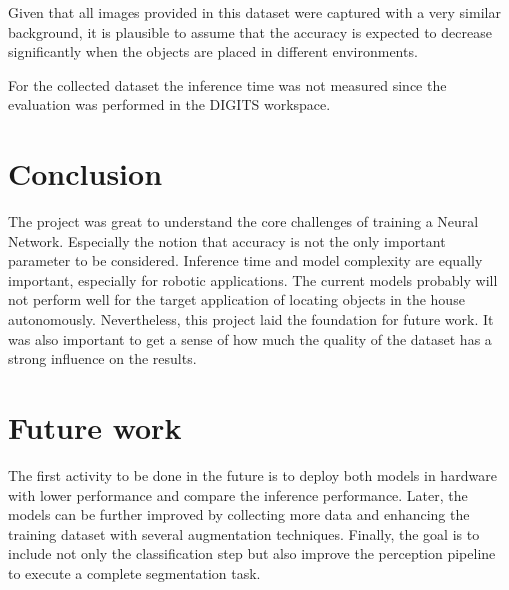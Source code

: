 \documentclass[10pt,journal,compsoc]{IEEEtran}
\begin{document}
Given that all images provided in this dataset were captured with a very similar background, it is plausible to assume that the accuracy is expected to decrease significantly when the objects are placed in different environments. 

For the collected dataset the inference time was not measured since the evaluation was performed in the DIGITS workspace.


\section{Conclusion}

The project was great to understand the core challenges of training a Neural Network. Especially the notion that accuracy is not the only important parameter to be considered. Inference time and model complexity are equally important, especially for robotic applications.
The current models probably will not perform well for the target application of locating objects in the house autonomously. Nevertheless, this project laid the foundation for future work. It was also important to get a sense of how much the quality of the dataset has a strong influence on the results.


\section{Future work}

The first activity to be done in the future is to deploy both models in hardware with lower performance and compare the inference performance. Later, the models can be further improved by collecting more data and enhancing the training dataset with several augmentation techniques. 
Finally, the goal is to include not only the classification step but also improve the perception pipeline to execute a complete segmentation task.




\end{document}
